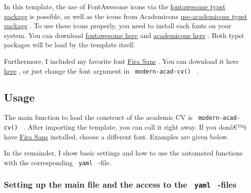 In this template, the use of FontAwesome icons via the
\href{https://typst.app/universe/package/fontawesome}{fontawesome typst
package} is possible, as well as the icons from Academicons
\href{https://typst.app/universe/package/use-academicons}{use-academicons
typst package} . To use these icons properly, you need to install each
fonts on your system. You can download
\href{https://fontawesome.com/download}{fontawesome here} and
\href{https://jpswalsh.github.io/academicons/}{academicons here} . Both
typst packages will be load by the template itself.

Furthermore, I included my favorite font
\href{https://fonts.google.com/specimen/Fira+Sans}{Fira Sans} . You can
download it here
\href{https://fonts.google.com/specimen/Fira+Sans}{here} , or just
change the font argument in \texttt{\ modern-acad-cv()\ } .

\subsection{Usage}\label{usage}

The main function to load the construct of the academic CV is
\texttt{\ modern-acad-cv()\ } . After importing the template, you can
call it right away. If you donâ€™t have
\href{https://fonts.google.com/specimen/Fira+Sans}{Fira Sans} installed,
choose a different font. Examples are given below.

\begin{Shaded}
\begin{Highlighting}[]

\NormalTok{)    }

\end{Highlighting}
\end{Shaded}

In the remainder, I show basic settings and how to use the automated
functions with the corresponding \texttt{\ yaml\ } -file.

\subsubsection{\texorpdfstring{Setting up the main file and the access
to the \texttt{\ yaml\ }
-files}{Setting up the main file and the access to the  yaml  -files}}\label{setting-up-the-main-file-and-the-access-to-the-yaml--files}

